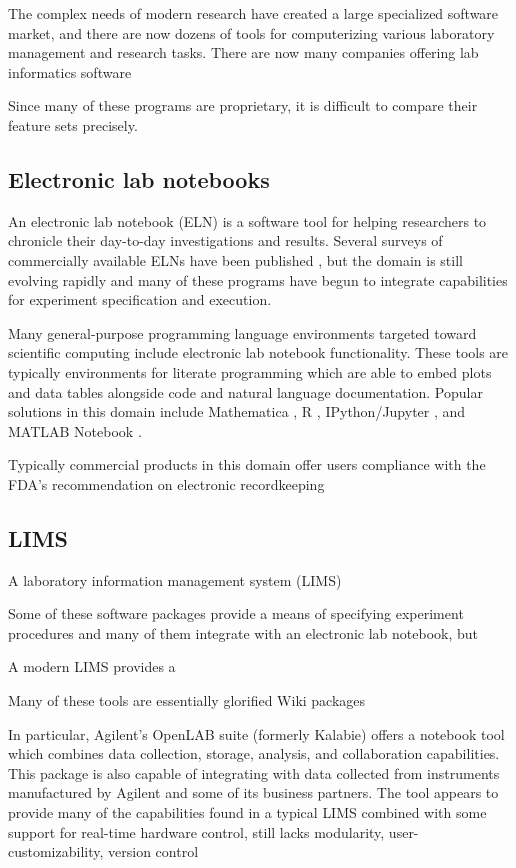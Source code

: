 \documentclass[../thesis]{subfiles}
\begin{document}
The complex needs of modern research have created a large specialized
software market, and there are now dozens of tools for computerizing
various laboratory management and research tasks. There are now many
companies offering lab informatics software

Since many of these programs are proprietary, it is difficult to
compare their feature sets precisely.



\subsection{Electronic lab notebooks}

An electronic lab notebook (ELN) is a software tool for helping
researchers to chronicle their day-to-day investigations and
results. Several surveys of commercially available ELNs have been
published \cite{Rubacha2011, }, but the domain is still evolving
rapidly and many of these programs have begun to integrate
capabilities for experiment specification and execution.

Many general-purpose programming language environments targeted toward
scientific computing include electronic lab notebook functionality.
These tools are typically environments for literate programming
\cite{Knuth:1984:LP:473.479} which are able to embed plots and data
tables alongside code and natural language documentation. Popular
solutions in this domain include Mathematica \cite{mathematica},
R \cite{Rlang}, IPython/Jupyter \cite{IPython}, and
MATLAB Notebook \cite{MATLAB}.

Typically commercial products in this domain offer users compliance
with the FDA's recommendation on electronic recordkeeping \cite{FDA}



\subsection{\gls{LIMS}}
A laboratory information management system (\gls{LIMS})

Some of these software packages provide a means of specifying
experiment procedures and many of them integrate with an electronic
lab notebook, but

A modern \gls{LIMS} provides a

Many of these tools are essentially glorified Wiki packages

In particular, Agilent's OpenLAB suite (formerly Kalabie) offers a
notebook tool which combines data collection, storage, analysis, and
collaboration capabilities. This package is also capable of
integrating with data collected from instruments manufactured by
Agilent and some of its business partners. The tool appears to provide
many of the capabilities found in a typical \gls{LIMS} combined with some
support for real-time hardware control,
 still lacks modularity, user-customizability, version control
\end{document}
